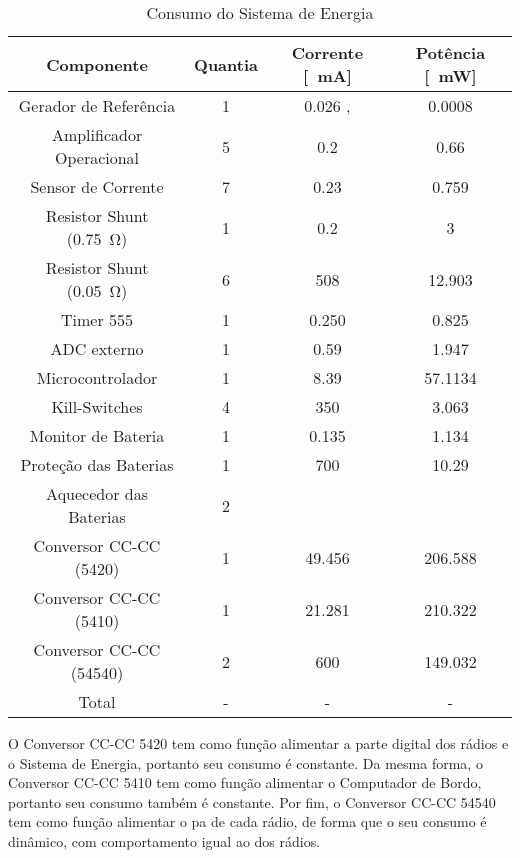 \begin{table}[!htpb]
\centering
\begin{tabular}{c c c c}
\\ \hline
Componente & Quantia & Corrente [\SI{}{\milli\ampere}] & Potência [\SI{}{\milli\watt}] \\ \hline \hline
Gerador de Referência & 1 & 0.026 \cite{ref5030}, \cite{msp430f6659} & 0.0008 \cite{ref5030} \\
Amplificador Operacional & 5 & 0.2 \cite{tlv341} & 0.66 \\
Sensor de Corrente & 7 & 0.23 \cite{max9934} & 0.759 \\
Resistor Shunt (\SI{0.75}{\ohm}) & 1 & 0.2 & 3 \\
Resistor Shunt (\SI{0.05}{\ohm}) & 6 & 508 & 12.903 \\
Timer 555 & 1 & 0.250 \cite{lmc555} & 0.825 \\
ADC externo & 1 & 0.59 \cite{ads1248} & 1.947 \\
Microcontrolador & 1 & 8.39 \cite{msp430f6659} & 57.1134 \cite{msp430f6659} \\
Kill-Switches & 4 & 350 & 3.063 \cite{si4403} \\
Monitor de Bateria & 1 & 0.135 \cite{ds2775} & 1.134 \cite{ds2775} \\
Proteção das Baterias & 1 & 700 & 10.29 \cite{fds6898az} \\
Aquecedor das Baterias & 2 & & \\
Conversor CC-CC (5420) & 1 & 49.456 & 206.588 \cite{tps5420} \\
Conversor CC-CC (5410) & 1 & 21.281 & 210.322 \cite{tps5410} \\
Conversor CC-CC (54540) & 2 & 600 & 149.032 \cite{tps54540} \\
Total & - & - & - \\ \hline
\end{tabular}
\caption{Consumo do Sistema de Energia}
\label{consumo_eps}
\end{table}

O Conversor CC-CC 5420 tem como função alimentar a parte digital dos rádios e o Sistema de Energia, portanto seu consumo é constante. Da mesma forma, o Conversor CC-CC 5410 tem como função alimentar o Computador de Bordo, portanto seu consumo também é constante. Por fim, o Conversor CC-CC 54540 tem como função alimentar o \gls{pa} de cada rádio, de forma que o seu consumo é dinâmico, com comportamento igual ao dos rádios.